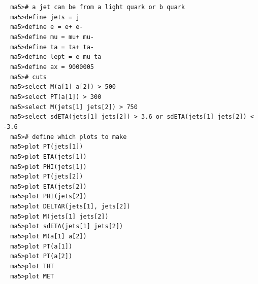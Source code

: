 \documentclass[a4paper, 10pt]{article}
\begin{document}
\texttt{ }\texttt{ }\texttt{ma5>\# a jet can be from a light quark or b quark\\
}
\texttt{ }\texttt{ }\texttt{ma5>define jets = j\\
}
\texttt{ }\texttt{ }\texttt{ma5>define e = e+ e-\\
}
\texttt{ }\texttt{ }\texttt{ma5>define mu = mu+ mu-\\
}
\texttt{ }\texttt{ }\texttt{ma5>define ta = ta+ ta-\\
}
\texttt{ }\texttt{ }\texttt{ma5>define lept = e mu ta\\
}
\texttt{ }\texttt{ }\texttt{ma5>define ax = 9000005\\
}
\texttt{ }\texttt{ }\texttt{ma5>\# cuts\\
}
\texttt{ }\texttt{ }\texttt{ma5>select M(a[1] a[2]) > 500\\
}
\texttt{ }\texttt{ }\texttt{ma5>select PT(a[1]) > 300\\
}
\texttt{ }\texttt{ }\texttt{ma5>select M(jets[1] jets[2]) > 750\\
}
\texttt{ }\texttt{ }\texttt{ma5>select sdETA(jets[1] jets[2]) > 3.6 or sdETA(jets[1] jets[2]) < -3.6\\
}
\texttt{ }\texttt{ }\texttt{ma5>\# define which plots to make\\
}
\texttt{ }\texttt{ }\texttt{ma5>plot PT(jets[1])\\
}
\texttt{ }\texttt{ }\texttt{ma5>plot ETA(jets[1])\\
}
\texttt{ }\texttt{ }\texttt{ma5>plot PHI(jets[1])\\
}
\texttt{ }\texttt{ }\texttt{ma5>plot PT(jets[2])\\
}
\texttt{ }\texttt{ }\texttt{ma5>plot ETA(jets[2])\\
}
\texttt{ }\texttt{ }\texttt{ma5>plot PHI(jets[2])\\
}
\texttt{ }\texttt{ }\texttt{ma5>plot DELTAR(jets[1], jets[2])\\
}
\texttt{ }\texttt{ }\texttt{ma5>plot M(jets[1] jets[2])\\
}
\texttt{ }\texttt{ }\texttt{ma5>plot sdETA(jets[1] jets[2])\\
}
\texttt{ }\texttt{ }\texttt{ma5>plot M(a[1] a[2])\\
}
\texttt{ }\texttt{ }\texttt{ma5>plot PT(a[1])\\
}
\texttt{ }\texttt{ }\texttt{ma5>plot PT(a[2])\\
}
\texttt{ }\texttt{ }\texttt{ma5>plot THT\\
}
\texttt{ }\texttt{ }\texttt{ma5>plot MET\\
}
\end{document}
